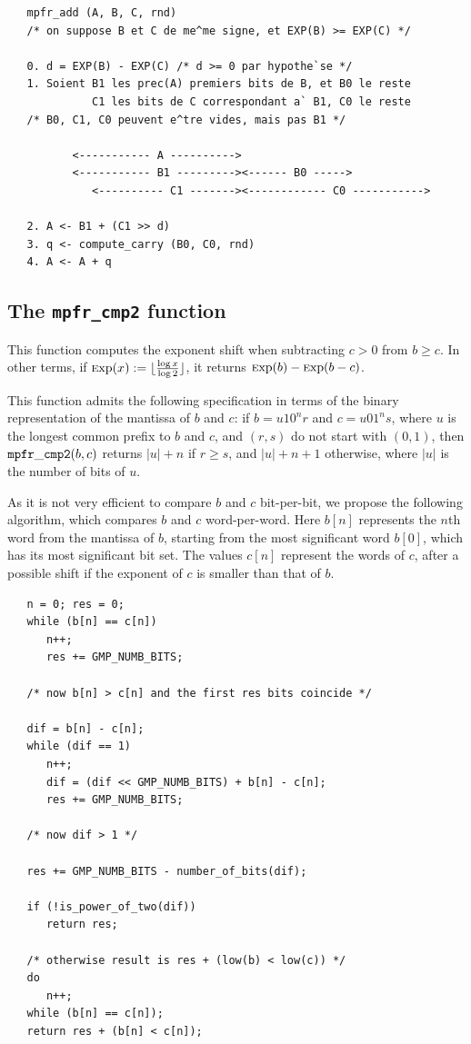 \documentclass[12pt]{amsart}
\def\Exp{{\rm \textsc exp}}
\begin{document}
\begin{verbatim}
   mpfr_add (A, B, C, rnd)
   /* on suppose B et C de me^me signe, et EXP(B) >= EXP(C) */

   0. d = EXP(B) - EXP(C) /* d >= 0 par hypothe`se */
   1. Soient B1 les prec(A) premiers bits de B, et B0 le reste
             C1 les bits de C correspondant a` B1, C0 le reste
   /* B0, C1, C0 peuvent e^tre vides, mais pas B1 */

          <----------- A ---------->
          <----------- B1 ---------><------ B0 ----->
             <---------- C1 -------><------------ C0 ----------->

   2. A <- B1 + (C1 >> d)
   3. q <- compute_carry (B0, C0, rnd)
   4. A <- A + q
\end{verbatim}

\subsection{The {\tt mpfr\_cmp2} function}

This function computes the exponent shift when subtracting $c > 0$ from
$b \ge c$. In other terms, if $\Exp(x) :=
\lfloor \frac{\log x}{\log 2} \rfloor$,
it returns $\Exp(b) - \Exp(b-c)$.

This function admits the following specification in terms of the binary
representation of the mantissa of $b$ and $c$: if $b = u 1 0^n r$ and
$c = u 0 1^n s$, where $u$ is the longest common prefix to $b$ and $c$,
and $(r,s)$ do not start with $(0, 1)$, then ${\tt mpfr\_cmp2}(b,c)$ returns
$|u| + n$ if $r \ge s$, and $|u| + n + 1$ otherwise, where $|u|$ is the number
of bits of $u$.

As it is not very efficient to compare $b$ and $c$ bit-per-bit, we propose
the following algorithm, which compares $b$ and $c$ word-per-word.
Here $b[n]$ represents the $n$th word from the mantissa of $b$, starting from
the most significant word $b[0]$, which has its most significant bit set.
The values $c[n]$ represent the words of $c$, after a possible shift if the
exponent of $c$ is smaller than that of $b$.
\begin{verbatim}
   n = 0; res = 0;
   while (b[n] == c[n])
      n++;
      res += GMP_NUMB_BITS;

   /* now b[n] > c[n] and the first res bits coincide */

   dif = b[n] - c[n];
   while (dif == 1)
      n++;
      dif = (dif << GMP_NUMB_BITS) + b[n] - c[n];
      res += GMP_NUMB_BITS;

   /* now dif > 1 */

   res += GMP_NUMB_BITS - number_of_bits(dif);

   if (!is_power_of_two(dif))
      return res;

   /* otherwise result is res + (low(b) < low(c)) */
   do
      n++;
   while (b[n] == c[n]);
   return res + (b[n] < c[n]);
\end{verbatim}
\end{document}
